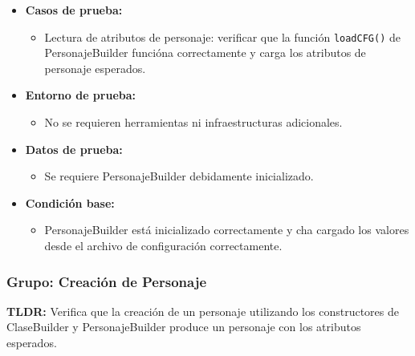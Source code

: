 \documentclass{article}
\begin{document}
\begin{itemize}
	\item \textbf{Casos de prueba:}
	\begin{itemize}
		\item Lectura de atributos de personaje: verificar que la función \texttt{loadCFG()} de PersonajeBuilder funcióna correctamente y carga los atributos de personaje esperados.
	\end{itemize}
	
	\item \textbf{Entorno de prueba:}
	\begin{itemize}
		\item No se requieren herramientas ni infraestructuras adicionales.
	\end{itemize}
	
	\item \textbf{Datos de prueba:}
	\begin{itemize}
		\item Se requiere PersonajeBuilder debidamente inicializado.
	\end{itemize}
	
	\item \textbf{Condición base:}
	\begin{itemize}
		\item PersonajeBuilder está inicializado correctamente  y cha cargado los valores desde el archivo de configuración correctamente.
	\end{itemize}
\end{itemize}


\subsubsection{Grupo: Creación de Personaje}
\textbf{TLDR:} Verifica que la creación de un personaje utilizando los constructores de ClaseBuilder y PersonajeBuilder produce un personaje con los atributos esperados.
\end{document}
